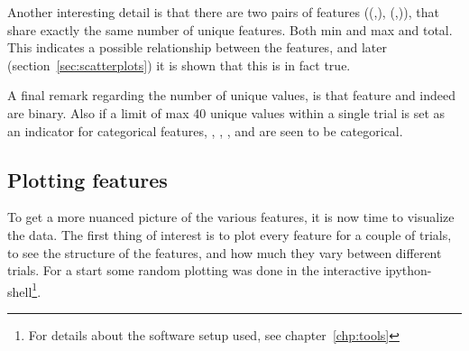 Another interesting detail is that there are two pairs of features ((,), (,)), that share exactly the same number of unique features. Both min and max and total. This indicates a possible relationship between the features, and later (section~\ref{sec:scatterplots}) it is shown that this is in fact true. \par

A final remark regarding the number of unique values, is that feature  and  indeed are binary. Also if a limit of max 40 unique values within a single trial is set as an indicator for categorical features, , , ,  and  are seen to be categorical. \par

\subsection{Plotting features}\label{sec:plotting-features}
To get a more nuanced picture of the various features, it is now time to visualize the data. The first thing of interest is to plot every feature for a couple of trials, to see the structure of the features, and how much they vary between different trials. For a start some random plotting was done in the interactive ipython-shell\footnote{For details about the software setup used, see chapter~\ref{chp:tools}}. \par
